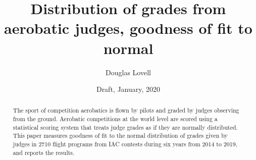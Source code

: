 \documentclass[10pt,twocolumn]{article}
\title{Distribution of grades from aerobatic judges, goodness of fit to normal}
\author{Douglas Lovell}
\date{Draft, January, 2020}
\begin{document}
\maketitle
\begin{abstract}
  The sport of competition aerobatics is flown by pilots and graded by
  judges observing from the ground.
  Aerobatic competitions at the world level are scored using a statistical
  scoring system that treats judge grades as if they are normally distributed.
  This paper measures goodness of fit to the normal distribution of
  grades given by judges in 2710 flight programs from IAC contests
  during six years from 2014 to 2019, and reports the results.
\end{abstract}












\end{document}
